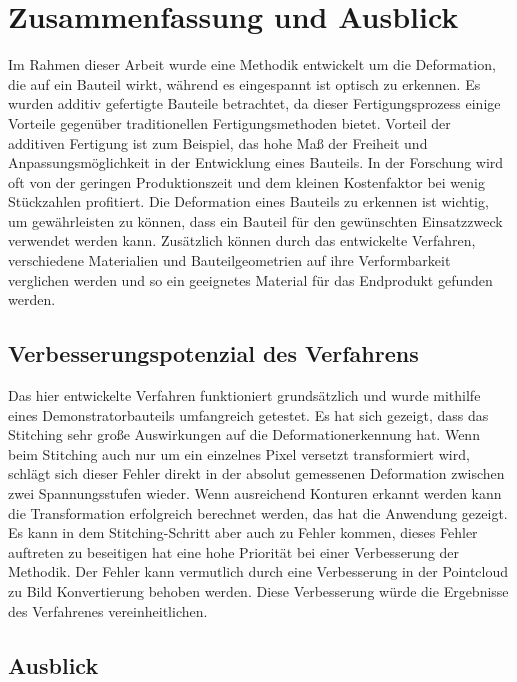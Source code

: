
\chapter{Zusammenfassung und Ausblick}

Im Rahmen dieser Arbeit wurde eine Methodik entwickelt um 
die Deformation, die auf ein Bauteil wirkt, während es eingespannt 
ist optisch zu erkennen. Es wurden additiv gefertigte Bauteile 
betrachtet, da dieser Fertigungsprozess einige Vorteile gegenüber
traditionellen Fertigungsmethoden bietet. 
Vorteil der additiven Fertigung ist zum Beispiel, das hohe Maß der Freiheit und 
Anpassungsmöglichkeit in der Entwicklung eines Bauteils. In der Forschung 
wird oft von der geringen Produktionszeit und dem kleinen Kostenfaktor 
bei wenig Stückzahlen profitiert. Die Deformation eines Bauteils zu 
erkennen ist wichtig, um gewährleisten zu können, dass ein Bauteil für 
den gewünschten Einsatzzweck verwendet werden kann. Zusätzlich können 
durch das entwickelte Verfahren, verschiedene Materialien und Bauteilgeometrien 
auf ihre Verformbarkeit verglichen werden und so ein geeignetes Material 
für das Endprodukt gefunden werden.

\section{Verbesserungspotenzial des Verfahrens}

Das hier entwickelte Verfahren funktioniert grundsätzlich und wurde mithilfe 
eines Demonstratorbauteils umfangreich getestet. Es hat sich gezeigt, dass 
das Stitching sehr große Auswirkungen auf die Deformationerkennung hat. 
Wenn beim Stitching auch nur um ein einzelnes Pixel versetzt transformiert wird,
schlägt sich dieser Fehler direkt in der absolut gemessenen 
Deformation zwischen zwei Spannungsstufen wieder.
Wenn ausreichend Konturen erkannt werden kann die Transformation erfolgreich
berechnet werden, das hat die Anwendung gezeigt. Es kann in dem Stitching-Schritt
aber auch zu Fehler kommen, dieses Fehler auftreten zu beseitigen hat eine hohe Priorität 
bei einer Verbesserung der Methodik. 
Der Fehler kann vermutlich durch eine Verbesserung in der Pointcloud zu Bild 
Konvertierung behoben werden. Diese Verbesserung würde die Ergebnisse 
des Verfahrenes vereinheitlichen. 

\section{Ausblick}

